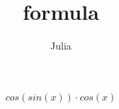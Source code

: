 \documentclass{article}
\title{formula}
\author{Julia}
\begin{document}
\maketitle

$$cos(sin(x)) \cdot cos(x)$$
\end{document}
